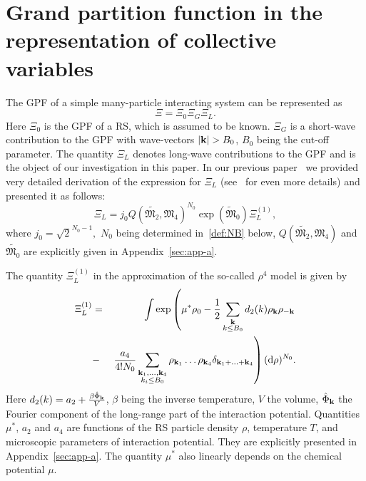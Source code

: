 \section{\label{sec:init-gpf} Grand partition function in the representation of collective variables}
The GPF of a simple many-particle interacting system can be represented as~\cite{Yukh1990,YukhJSP1995,RomaJPS2024}
\begin{equation}
	\label{Xi_as_prod}
	\Xi = \Xi_0\Xi_G\Xi_L.
\end{equation}
Here $\Xi_0$ is the GPF of a RS, which is assumed to be known. $\Xi_G$ is a short-wave contribution to the GPF with wave-vectors $\abs{\vb{k}}>B_0$, $B_0$ being the cut-off parameter.
The quantity $\Xi_L$ denotes long-wave contributions to the GPF and is the object of our investigation in this paper. In our previous paper~\cite{RomaJPS2024} we provided very detailed derivation of the expression for $\Xi_L$ (see~\cite{Roma2023Preprint} for even more details) and presented it as follows:
\begin{equation}
	\label{Xi_L}
	\Xi_L = j_0Q(\tilde{\mathfrak{M}_2}, \mathfrak{M}_4)^{N_0} \exp(\tilde{\mathfrak{M}}_0) \Xi_L^{(1)},
\end{equation} 
where $j_0=\sqrt{2}^{N_0 - 1},$ $N_0$ being determined in~\eqref{def:NB} below, $Q(\tilde{\mathfrak{M}_2}, \mathfrak{M}_4)$ and $\tilde{\mathfrak{M}_0}$ are explicitly given in Appendix~\ref{sec:app-a}.

The quantity $\Xi_L^{(1)}$ in the approximation of the so-called $\rho^4$ model is given by
\begin{eqnarray}
	\label{Xi_L_1}
	\Xi_L^{(1)} &=& 
	\int \exp\left(
	\mu^* \rho_0 - \frac{1}{2} \sum_{\substack{\vb k \\ k \leq B_0}} d_2(k) \rho_{\vb k} \rho_{-\vb k} 
	\right.\\
	& - & \left. \frac{a_4}{4! N_0} \sum_{\substack{\vb k_1, \dotsc, \vb k_4 \\ k_i \leq B_0}} \rho_{\vb k_1} \dotsc \rho_{\vb k_4} \delta_{\vb{k}_1 + \dotsc + \vb{k}_4} \right) ({\rm d} \rho)^{N_0}
	\nonumber.
\end{eqnarray}
Here $d_2(k) = a_2 + \frac{\beta\hat{\Phi}_{\vb k}}{V}$, $\beta$ being the inverse temperature, $V$ the volume, $\hat{\Phi}_{\vb k}$ the Fourier component of the long-range part of the interaction potential.
Quantities $\mu^*$, $a_2$ and $a_4$ are functions of the RS particle density $\rho$, temperature $T$, and microscopic parameters of interaction potential. They are explicitly presented in Appendix~\ref{sec:app-a}. The quantity $\mu^*$ also linearly depends on the chemical potential $\mu$.

